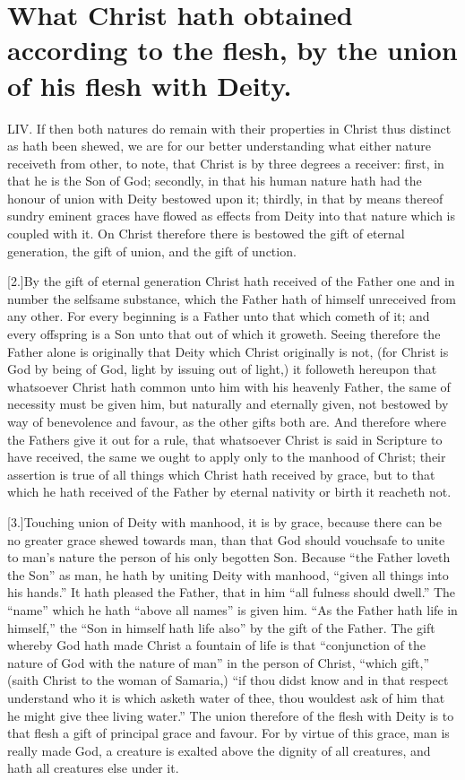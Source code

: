 \section*{What Christ hath obtained according to the flesh, by the union of his flesh with Deity.}
LIV. If then both natures do remain with their properties in Christ thus distinct as hath been shewed, we are for our better understanding what either nature receiveth from other, to note, that Christ is by three degrees a receiver: first, in that  he is the Son of God; secondly, in that his human nature hath had the honour of union with Deity bestowed upon it; thirdly, in that by means thereof sundry eminent graces have flowed as effects from Deity into that nature which is coupled with it. On Christ therefore there is bestowed the gift of eternal generation,
 the gift of union, and the gift of unction.

[2.]By the gift of eternal generation Christ hath received of the Father one and in number the selfsame substance, which the Father hath of himself unreceived from any other. For every beginning is a Father unto that which cometh of it; and every offspring is a Son unto that out of which it groweth. Seeing therefore the Father alone is originally that Deity which Christ originally is not, (for Christ is God by being of God, light by issuing out of light,) it followeth hereupon that whatsoever Christ hath common unto him with his heavenly Father, the same of necessity must be given him,  but naturally and eternally given, not bestowed by way of benevolence and favour, as the other gifts both are.
 And therefore where the Fathers give it out for a rule, that whatsoever Christ is said in Scripture to have received, the same we ought to apply only to the manhood of Christ; their assertion is true of all things which Christ hath received by grace, but to that which he hath received of the Father by eternal nativity or birth it reacheth not.

[3.]Touching union of Deity with manhood, it is by grace, because there can be no greater grace shewed towards man, than that God should vouchsafe to unite to man’s nature the person of his only begotten Son. Because “the Father loveth the Son” as man, he hath by uniting Deity with manhood, “given all things into his hands.” It hath pleased the Father, that in him “all fulness should dwell.” The “name” which he hath “above all names” is given him. “As the Father hath life in himself,” the “Son in himself hath life also” by the gift of the Father. The gift whereby God hath made Christ a fountain of life is that “conjunction of the nature of God with the nature of man” in the person of Christ, “which gift,” (saith Christ to the woman of Samaria,) “if thou didst know and in that respect understand who it is which asketh water of thee, thou wouldest ask of him that he might give thee living water.” The union therefore of the flesh with Deity is to that flesh a gift of principal grace and favour. For by virtue of this grace, man is really made God, a creature is exalted above the dignity of all creatures, and hath all creatures else under it.




